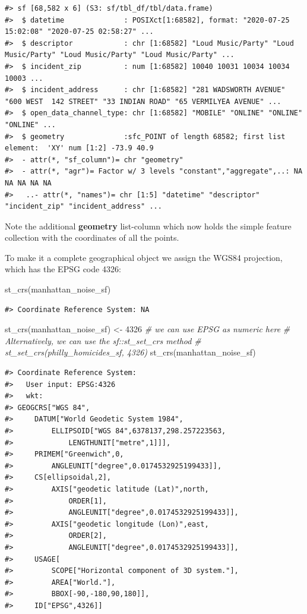 \documentclass[
  11pt,
]{book}
\newenvironment{Shaded}{\begin{snugshade}}{\end{snugshade}}
\newcommand{\CommentTok}[1]{\textcolor[rgb]{0.56,0.35,0.01}{\textit{#1}}}
\newcommand{\DecValTok}[1]{\textcolor[rgb]{0.00,0.00,0.81}{#1}}
\newcommand{\FunctionTok}[1]{\textcolor[rgb]{0.00,0.00,0.00}{#1}}
\newcommand{\NormalTok}[1]{#1}
\newcommand{\OtherTok}[1]{\textcolor[rgb]{0.56,0.35,0.01}{#1}}
\begin{document}
\begin{verbatim}
#> sf [68,582 x 6] (S3: sf/tbl_df/tbl/data.frame)
#>  $ datetime              : POSIXct[1:68582], format: "2020-07-25 15:02:08" "2020-07-25 02:58:27" ...
#>  $ descriptor            : chr [1:68582] "Loud Music/Party" "Loud Music/Party" "Loud Music/Party" "Loud Music/Party" ...
#>  $ incident_zip          : num [1:68582] 10040 10031 10034 10034 10003 ...
#>  $ incident_address      : chr [1:68582] "281 WADSWORTH AVENUE" "600 WEST  142 STREET" "33 INDIAN ROAD" "65 VERMILYEA AVENUE" ...
#>  $ open_data_channel_type: chr [1:68582] "MOBILE" "ONLINE" "ONLINE" "ONLINE" ...
#>  $ geometry              :sfc_POINT of length 68582; first list element:  'XY' num [1:2] -73.9 40.9
#>  - attr(*, "sf_column")= chr "geometry"
#>  - attr(*, "agr")= Factor w/ 3 levels "constant","aggregate",..: NA NA NA NA NA
#>   ..- attr(*, "names")= chr [1:5] "datetime" "descriptor" "incident_zip" "incident_address" ...
\end{verbatim}

Note the additional \textbf{geometry} list-column which now holds the simple feature collection with the coordinates of all the points.

To make it a complete geographical object we assign the WGS84 projection, which has the EPSG code 4326:

\begin{Shaded}
\begin{Highlighting}[]
\FunctionTok{st\_crs}\NormalTok{(manhattan\_noise\_sf)}
\end{Highlighting}
\end{Shaded}

\begin{verbatim}
#> Coordinate Reference System: NA
\end{verbatim}

\begin{Shaded}
\begin{Highlighting}[]
\FunctionTok{st\_crs}\NormalTok{(manhattan\_noise\_sf) }\OtherTok{\textless{}{-}} \DecValTok{4326} \CommentTok{\# we can use EPSG as numeric here}
\CommentTok{\# Alternatively, we can use the sf::st\_set\_crs method}
\CommentTok{\# st\_set\_crs(philly\_homicides\_sf, 4326)}
\FunctionTok{st\_crs}\NormalTok{(manhattan\_noise\_sf)}
\end{Highlighting}
\end{Shaded}

\begin{verbatim}
#> Coordinate Reference System:
#>   User input: EPSG:4326 
#>   wkt:
#> GEOGCRS["WGS 84",
#>     DATUM["World Geodetic System 1984",
#>         ELLIPSOID["WGS 84",6378137,298.257223563,
#>             LENGTHUNIT["metre",1]]],
#>     PRIMEM["Greenwich",0,
#>         ANGLEUNIT["degree",0.0174532925199433]],
#>     CS[ellipsoidal,2],
#>         AXIS["geodetic latitude (Lat)",north,
#>             ORDER[1],
#>             ANGLEUNIT["degree",0.0174532925199433]],
#>         AXIS["geodetic longitude (Lon)",east,
#>             ORDER[2],
#>             ANGLEUNIT["degree",0.0174532925199433]],
#>     USAGE[
#>         SCOPE["Horizontal component of 3D system."],
#>         AREA["World."],
#>         BBOX[-90,-180,90,180]],
#>     ID["EPSG",4326]]
\end{verbatim}
\end{document}
